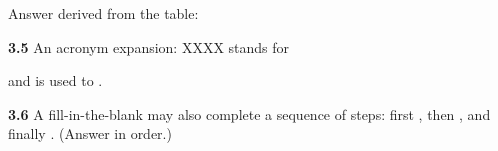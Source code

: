 Answer derived from the table: \blank{9cm}

\vspace{4mm}

\textbf{3.5}
An acronym expansion: XXXX stands for

\blank{9cm}

\noindent and is used to \blank{5cm}.

\vspace{4mm}

\textbf{3.6}
A fill-in-the-blank may also complete a sequence of steps:
first \blank{3cm}, then \blank{3cm}, and finally \blank{3cm}.
(Answer in order.)
